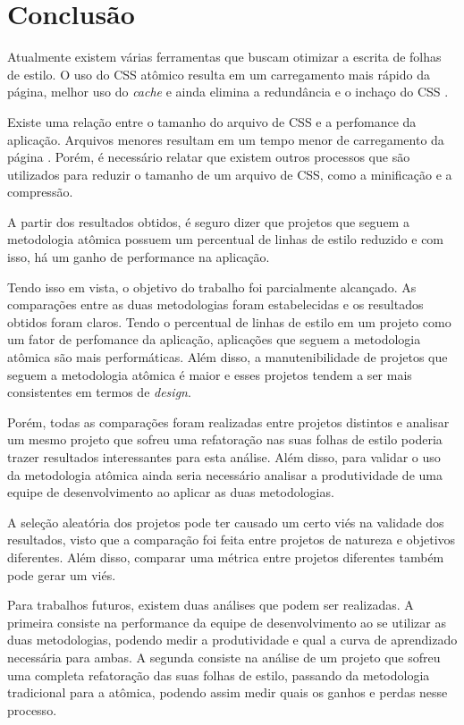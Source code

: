 \newpage



\hypertarget{conclusuxe3o}{%
\chapter{Conclusão}\label{conclusuxe3o}}

Atualmente existem várias ferramentas que buscam otimizar a escrita de
folhas de estilo. O uso do CSS atômico resulta em um carregamento mais
rápido da página, melhor uso do \emph{cache} e ainda elimina a
redundância e o inchaço do CSS \cite{ardeljan, koblentz}.

Existe uma relação entre o tamanho do arquivo de CSS e a perfomance da aplicação. Arquivos menores resultam em um tempo menor de carregamento da página \cite{ardeljan, bece}. Porém, é necessário relatar que existem outros processos que são utilizados para reduzir o tamanho de um arquivo de CSS, como a minificação e a compressão.

A partir dos resultados obtidos, é seguro dizer que projetos que seguem a metodologia atômica possuem um percentual de linhas de estilo reduzido e com isso, há um ganho de performance na aplicação.

Tendo isso em vista, o objetivo do trabalho foi parcialmente alcançado. As comparações entre as duas metodologias foram estabelecidas e os resultados obtidos foram claros. Tendo o percentual de linhas de estilo em um projeto como um fator de perfomance da aplicação, aplicações que seguem a metodologia atômica são mais performáticas. Além disso, a manutenibilidade de projetos que seguem a metodologia atômica é maior e esses projetos tendem a ser mais consistentes em termos de \emph{design}.

Porém, todas as comparações foram realizadas entre projetos distintos e analisar um mesmo projeto que sofreu uma refatoração nas suas folhas de estilo poderia trazer resultados interessantes para esta análise. Além disso, para validar o uso da metodologia atômica ainda seria necessário analisar a produtividade de uma equipe de desenvolvimento ao aplicar as duas metodologias.

A seleção aleatória dos projetos pode ter causado um certo viés na validade dos resultados, visto que a comparação foi feita entre projetos de natureza e objetivos diferentes. Além disso, comparar uma métrica entre projetos diferentes também pode gerar um viés.

Para trabalhos futuros, existem duas análises que podem ser realizadas. A primeira consiste na performance da equipe de desenvolvimento ao se utilizar as duas metodologias, podendo medir a produtividade e qual a curva de aprendizado necessária para ambas. A segunda consiste na análise de um projeto que sofreu uma completa refatoração das suas folhas de estilo, passando da metodologia tradicional para a atômica, podendo assim medir quais os ganhos e perdas nesse processo.  
\nocite{hooks}

